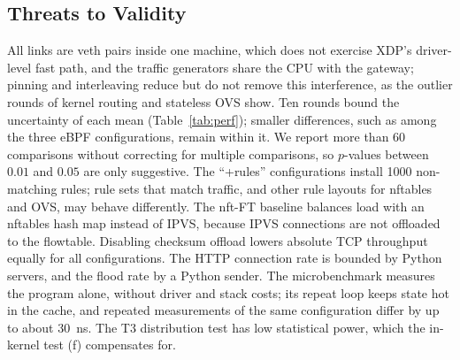 \documentclass[conference]{IEEEtran}
\begin{document}
\subsection{Threats to Validity}
\label{sec:threats}
All links are veth pairs inside one machine, which does not exercise XDP's
driver-level fast path, and the traffic generators share the CPU with the
gateway; pinning and interleaving reduce but do not remove this
interference, as the outlier rounds of kernel routing and stateless OVS show.
Ten rounds bound the uncertainty of each mean (Table~\ref{tab:perf}); smaller
differences, such as among the three eBPF configurations, remain within it.
We report more than 60 comparisons without correcting for multiple
comparisons, so $p$-values between $0.01$ and $0.05$ are only suggestive.
The ``+rules'' configurations install 1000 non-matching rules; rule sets that
match traffic, and other rule layouts for nftables and OVS, may behave
differently. The nft-FT baseline balances load with an nftables hash map
instead of IPVS, because IPVS connections are not offloaded to the
flowtable. Disabling checksum offload lowers absolute TCP throughput equally
for all configurations. The HTTP connection rate is bounded by Python
servers, and the flood rate by a Python sender. The microbenchmark measures
the program alone, without driver and stack costs; its repeat loop keeps
state hot in the cache, and repeated measurements of the same configuration
differ by up to about 30~ns. The T3 distribution test has low statistical
power, which the in-kernel test (f) compensates for.

\end{document}
